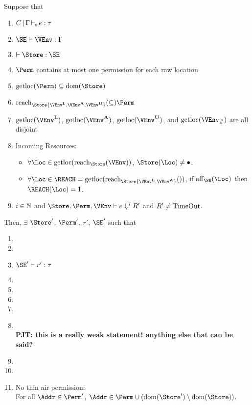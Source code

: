 \newcommand\resultThinAir[2]{
  No thin air permission: \\
  For all $\Addr\in {\Perm#2}$, $\Addr
  \in \Perm#1 \cup ( \Dom{\Store#2} \setminus \Dom{\Store#1})$.
}
\begin{theorem}
  Suppose that
  \begin{enumerate}[({A}1)]
  \item $C \operatorname{|} \Gamma \operatorname{\vdash_s} e : \tau$
  \item $\SE \vdash \VEnv : \E$
  \item $\vdash \Store : \SE$
  \item $\Perm$ contains at most one permission for
    each raw location
  \item\label{item:11} $\Rawloc\Perm \subseteq \Dom\Store$
  \item $\Reach\Store{\Active\VEnv, \MutableBorrows\VEnv,
      \ImmutableBorrows\VEnv} \subseteq \Perm$
  \item $\Rawloc{\Active\VEnv}$,
    $\Rawloc{\MutableBorrows\VEnv}$,
    $\Rawloc{\ImmutableBorrows\VEnv}$, and
    $\Rawloc{\Suspended\VEnv}$ are all disjoint
  \item Incoming Resources: 
    \begin{itemize}
    \item $\forall \Loc\in \Rawloc{\Reach\Store\VEnv}$,  $\Store (\Loc) \ne
      \StFreed$.
    \item $\forall \Loc \in \REACH =\Rawloc{\Reach\Store{\Active\VEnv,\MutableBorrows\VEnv}}$,
      if $\Affine\SE\Loc$ then  $\MultiNumber\Loc\REACH= 1$.
    \end{itemize}
  \item  $i\in\mathbb{N}$ and $\Store, \Perm, \VEnv \vdash {e}
    \Downarrow^i R'$ and $R'\ne \operatorname{TimeOut}$.
  \end{enumerate}
  Then,
  $\exists$ $\Store'$, $\Perm'$, $r'$, $\SE'$ such that
  \begin{enumerate}[({R}1)]
  \item {}
  \item {}
  \item $\SE' \vdash r' : \tau$
  \item {}
  \item {}
  \item {}
  \item {}
  \item {}
    \\\textbf{PJT: this is a really weak statement! anything else that
      can be said?}
  \item {}
  \item {}
  \item \resultThinAir{}{'}
  \end{enumerate}
\end{theorem}

